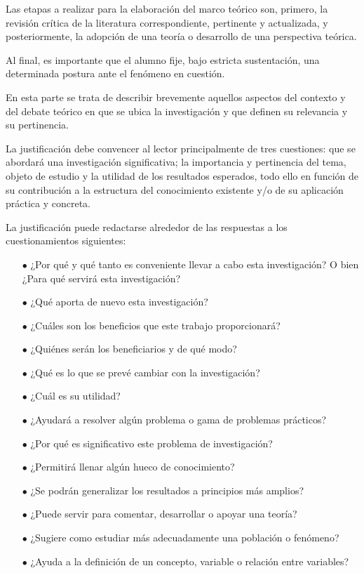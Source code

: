 \documentclass[10pt,a4paper]{protocol}
\begin{document}
Las etapas a realizar para la elaboración del marco teórico son, primero, la revisión crítica de la literatura correspondiente, pertinente y actualizada, y posteriormente, la adopción de una teoría o desarrollo de una perspectiva teórica. \\ \vspace*{0.5cm}

Al final, es importante que el alumno fije, bajo estricta sustentación, una determinada postura ante el fenómeno en cuestión. \\ \vspace*{0.5cm}

En esta parte se trata de describir brevemente aquellos aspectos del contexto y del debate teórico en que se ubica la investigación y que definen su relevancia y su pertinencia.\\ \vspace*{0.5cm}

La justificación debe convencer al lector principalmente de tres cuestiones: que se abordará una investigación significativa; la importancia y pertinencia del tema,  objeto de estudio y la utilidad de los resultados esperados, todo ello en función de su contribución a la estructura del conocimiento existente y/o de su aplicación práctica y concreta. \\ \vspace*{0.5cm}

La justificación puede redactarse alrededor de las respuestas a los cuestionamientos siguientes: 
\begin{itemize}
	\item[$ \bullet $] ¿Por qué y qué tanto es conveniente llevar a cabo esta investigación? O bien ¿Para qué servirá esta investigación?
	\item[$ \bullet $] ¿Qué aporta de nuevo esta investigación?
	\item[$ \bullet $] ¿Cuáles son los beneficios que este trabajo proporcionará?
	\item[$ \bullet $] ¿Quiénes serán los beneficiarios y de qué modo?
	\item[$ \bullet $] ¿Qué es lo que se prevé cambiar con la investigación?
	\item[$ \bullet $] ¿Cuál es su utilidad?
	\item[$ \bullet $] ¿Ayudará a resolver algún problema o gama de problemas prácticos?
	\item[$ \bullet $] ¿Por qué es significativo este problema de investigación?
	\item[$ \bullet $] ¿Permitirá llenar algún hueco de conocimiento?
	\item[$ \bullet $] ¿Se podrán generalizar los resultados a principios más amplios?
	\item[$ \bullet $] ¿Puede servir para comentar, desarrollar o apoyar una teoría?
	\item[$ \bullet $] ¿Sugiere como estudiar más adecuadamente una población o fenómeno?
	\item[$ \bullet $] ¿Ayuda a la definición de un concepto, variable o relación entre variables?
\end{itemize}
\end{document}
